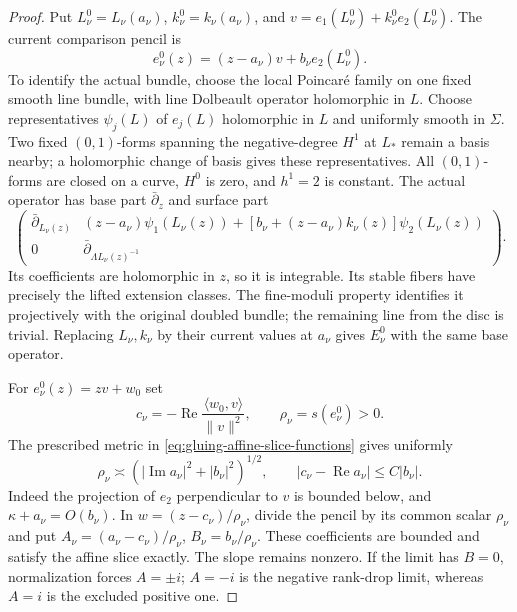 \documentclass[11pt]{amsart}
\theoremstyle{definition}
\theoremstyle{remark}
\theoremstyle{plain}
\begin{document}
\begin{proof}
Put $L_\nu^0=L_\nu(a_\nu)$, $k_\nu^0=k_\nu(a_\nu)$, and
$v=e_1(L_\nu^0)+k_\nu^0e_2(L_\nu^0)$. The current comparison
pencil is
\begin{equation}\label{eq:converse-current-pencil}
              e_\nu^0(z)=(z-a_\nu)v+b_\nu e_2(L_\nu^0).
\end{equation}
To identify the actual bundle, choose the local Poincaré family
on one fixed smooth line bundle, with line Dolbeault operator
holomorphic in $L$. Choose representatives $\psi_j(L)$ of $e_j(L)$
holomorphic in $L$ and uniformly smooth in $\Sigma$. Two fixed
$(0,1)$-forms spanning the negative-degree $H^1$ at $L_*$
remain a basis nearby; a holomorphic change of basis gives
these representatives. All $(0,1)$-forms are closed on a curve,
$H^0$ is zero, and $h^1=2$ is constant.
The actual operator has base part $\bar\partial_z$ and surface part
\begin{equation}\label{eq:converse-stable-operator}
\begin{pmatrix}
 \bar\partial_{L_\nu(z)}
 &(z-a_\nu)\psi_1(L_\nu(z))
       +[b_\nu+(z-a_\nu)k_\nu(z)]\psi_2(L_\nu(z))\\
 0&\bar\partial_{\Lambda L_\nu(z)^{-1}}
\end{pmatrix}.
\end{equation}
Its coefficients are holomorphic in $z$, so it is integrable.
Its stable fibers have precisely the lifted extension classes.
The fine-moduli property identifies it projectively with the
original doubled bundle; the remaining line from the disc is
trivial. Replacing $L_\nu,k_\nu$ by their current values at
$a_\nu$ gives $E_\nu^0$ with the same base operator.

For $e_\nu^0(z)=zv+w_0$ set
\begin{equation}\label{eq:converse-normalized-center}
 c_\nu=-\operatorname{Re}\frac{\langle w_0,v\rangle}{\|v\|^2},
 \qquad
 \rho_\nu=s(e_\nu^0)>0.
\end{equation}
The prescribed metric in \eqref{eq:gluing-affine-slice-functions}
gives uniformly
\[
 \rho_\nu\asymp
       (|\operatorname{Im}a_\nu|^2+|b_\nu|^2)^{1/2},
 \qquad |c_\nu-\operatorname{Re}a_\nu|\leq C|b_\nu|.
\]
Indeed the projection of $e_2$ perpendicular to $v$ is bounded
below, and $\kappa+a_\nu=O(b_\nu)$.
In $w=(z-c_\nu)/\rho_\nu$, divide the pencil by its common
scalar $\rho_\nu$ and put
$A_\nu=(a_\nu-c_\nu)/\rho_\nu$, $B_\nu=b_\nu/\rho_\nu$.
These coefficients are bounded and satisfy the affine slice
exactly. The slope remains nonzero. If the limit has $B=0$,
normalization forces $A=\pm i$; $A=-i$ is the negative
rank-drop limit, whereas $A=i$ is the excluded positive one.


\end{proof}
\end{document}
